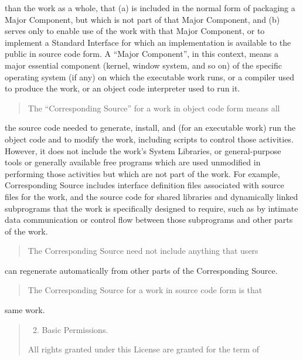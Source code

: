\documentclass[letterpaper,10pt,english]{sphinxmanual}
\begin{document}
than the work as a whole, that (a) is included in the normal form of
packaging a Major Component, but which is not part of that Major
Component, and (b) serves only to enable use of the work with that
Major Component, or to implement a Standard Interface for which an
implementation is available to the public in source code form.  A
“Major Component”, in this context, means a major essential component
(kernel, window system, and so on) of the specific operating system
(if any) on which the executable work runs, or a compiler used to
produce the work, or an object code interpreter used to run it.
\begin{quote}

The “Corresponding Source” for a work in object code form means all
\end{quote}

the source code needed to generate, install, and (for an executable
work) run the object code and to modify the work, including scripts to
control those activities.  However, it does not include the work’s
System Libraries, or general-purpose tools or generally available free
programs which are used unmodified in performing those activities but
which are not part of the work.  For example, Corresponding Source
includes interface definition files associated with source files for
the work, and the source code for shared libraries and dynamically
linked subprograms that the work is specifically designed to require,
such as by intimate data communication or control flow between those
subprograms and other parts of the work.
\begin{quote}

The Corresponding Source need not include anything that users
\end{quote}

can regenerate automatically from other parts of the Corresponding
Source.
\begin{quote}

The Corresponding Source for a work in source code form is that
\end{quote}

same work.
\begin{quote}
\begin{enumerate}
\setcounter{enumi}{1}
\item {} 
Basic Permissions.

\end{enumerate}

All rights granted under this License are granted for the term of
\end{quote}
\end{document}

